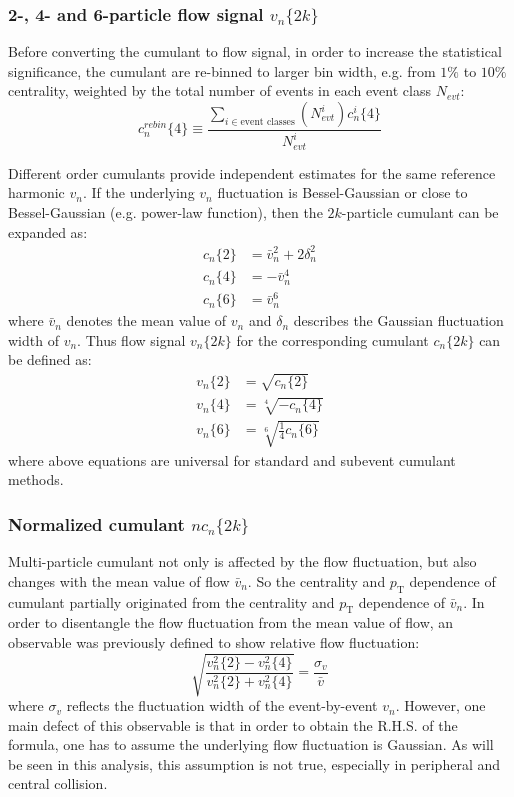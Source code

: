 \subsubsection{2-, 4- and 6-particle flow signal $v_n\{2k\}$}
Before converting the cumulant to flow signal, in order to increase the statistical significance, the cumulant are re-binned to larger bin width, e.g. from $1\%$ to $10\%$ centrality, weighted by the total number of events in each event class $N_{evt}$:
\begin{equation}
c_n^{rebin}\{4\}\equiv \frac{\sum_{i\in \text{event classes}} (N_{evt}^i)c_n^i\{4\}}{N_{evt}^i}
\end{equation}

Different order cumulants provide independent estimates for the same reference harmonic $v_n$. If the underlying $v_n$ fluctuation is Bessel-Gaussian or close to Bessel-Gaussian (e.g. power-law function), then the $2k$-particle cumulant can be expanded as:
\begin{equation}
\begin{split}
c_n\{2\} &= \bar{v}_n^2+2\delta_n^2 \\
c_n\{4\} &= -\bar{v}_n^4 \\
c_n\{6\} &= \bar{v}_n^6
\end{split}
\end{equation}
where $\bar{v}_n$ denotes the mean value of $v_n$ and $\delta_n$ describes the Gaussian fluctuation width of $v_n$. Thus flow signal $v_n\{2k\}$ for the corresponding cumulant $c_n\{2k\}$ can be defined as:
\begin{equation}
\begin{split}
v_n\{2\} &= \sqrt{c_n\{2\}} \\
v_n\{4\} &= \sqrt[4]{-c_n\{4\}} \\
v_n\{6\} &= \sqrt[6]{\frac{1}{4}c_n\{6\}}
\end{split}
\end{equation}
where above equations are universal for standard and subevent cumulant methods.



\subsubsection{Normalized cumulant $nc_n\{2k\}$}
Multi-particle cumulant not only is affected by the flow fluctuation, but also changes with the mean value of flow $\bar{v}_n$. So the centrality and $p_\text{T}$ dependence of cumulant partially originated from the centrality and $p_\text{T}$ dependence of $\bar{v}_n$. In order to disentangle the flow fluctuation from the mean value of flow, an observable was previously defined to show relative flow fluctuation:
\begin{equation}
\sqrt{\frac{v_n^2\{2\}-v_n^2\{4\}}{v_n^2\{2\}+v_n^2\{4\}}}=\frac{\sigma_v}{\bar{v}}
\end{equation}
where $\sigma_v$ reflects the fluctuation width of the event-by-event $v_n$. However, one main defect of this observable is that in order to obtain the R.H.S. of the formula, one has to assume the underlying flow fluctuation is Gaussian. As will be seen in this analysis, this assumption is not true, especially in peripheral and central collision.

